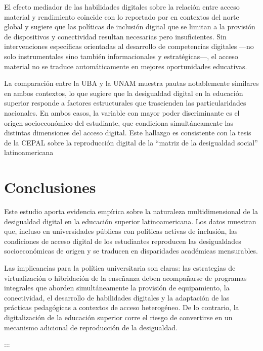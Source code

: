 El efecto mediador de las habilidades digitales sobre la relación entre acceso material y rendimiento coincide con lo reportado por \autocite*{2565-HARGITTAI2002} en contextos del norte global y sugiere que las políticas de inclusión digital que se limitan a la provisión de dispositivos y conectividad resultan necesarias pero insuficientes. Sin intervenciones específicas orientadas al desarrollo de competencias digitales —no solo instrumentales sino también informacionales y estratégicas—, el acceso material no se traduce automáticamente en mejores oportunidades educativas.

La comparación entre la UBA y la UNAM muestra pautas notablemente similares en ambos contextos, lo que sugiere que la desigualdad digital en la educación superior responde a factores estructurales que trascienden las particularidades nacionales. En ambos casos, la variable con mayor poder discriminante es el origen socioeconómico del estudiante, que condiciona simultáneamente las distintas dimensiones del acceso digital. Este hallazgo es consistente con la tesis de la CEPAL sobre la reproducción digital de la “matriz de la desigualdad social” latinoamericana \autocite{2566-CEPAL2021}


\section{Conclusiones}
Este estudio aporta evidencia empírica sobre la naturaleza multidimensional de la desigualdad digital en la educación superior latinoamericana. Los datos muestran que, incluso en universidades públicas con políticas activas de inclusión, las condiciones de acceso digital de los estudiantes reproducen las desigualdades socioeconómicas de origen y se traducen en disparidades académicas mensurables.

Las implicancias para la política universitaria son claras: las estrategias de virtualización o hibridación de la enseñanza deben acompañarse de programas integrales que aborden simultáneamente la provisión de equipamiento, la conectividad, el desarrollo de habilidades digitales y la adaptación de las prácticas pedagógicas a contextos de acceso heterogéneo. De lo contrario, la digitalización de la educación superior corre el riesgo de convertirse en un mecanismo adicional de reproducción de la desigualdad.

:::


